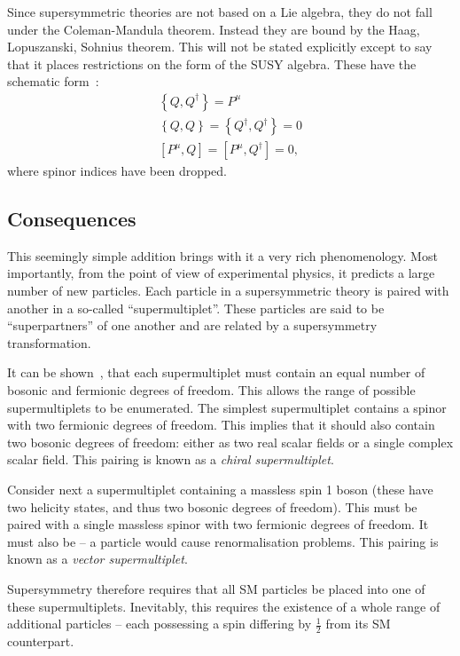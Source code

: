 Since supersymmetric theories are not based on a Lie algebra, they do not fall
under the Coleman-Mandula theorem. Instead they are bound by the Haag,
Lopuszanski, Sohnius theorem. This will not be stated explicitly except to say
that it places restrictions on the form of the \ac{SUSY} algebra. These have the
schematic form~\cite{susy_primer}:
\begin{eqnarray}
\label{eqn:susy_commutator}
\left\{Q,Q^{\dagger}\right\} = P^{\mu}\\
\left\{Q,Q\right\} = \left\{Q^{\dagger}, Q^{\dagger}\right\} = 0\\
\left[P^{\mu}, Q\right] = \left[P^{\mu}, Q^{\dagger}\right] = 0,
\end{eqnarray}
where spinor indices have been dropped.

\subsection{Consequences}
\label{sec:consequences}
This seemingly simple addition brings with it a very rich phenomenology. Most
importantly, from the point of view of experimental physics, it predicts a large
number of new particles. Each particle in a supersymmetric theory is paired with
another in a so-called ``supermultiplet''. These particles are said to be
``superpartners'' of one another and are related by a supersymmetry
transformation.

It can be shown~\cite{susy_primer}, that each supermultiplet must contain an
equal number of bosonic and fermionic degrees of freedom. This allows the range
of possible supermultiplets to be enumerated. The simplest supermultiplet
contains a spinor with two fermionic degrees of freedom. This implies that it
should also contain two bosonic degrees of freedom: either as two real scalar
fields or a single complex scalar field. This pairing is known as a \emph{chiral
  supermultiplet}.

Consider next a supermultiplet containing a massless spin 1 boson (these have
two helicity states, and thus two bosonic degrees of freedom). This must be
paired with a single massless spinor with two fermionic degrees of freedom. It
must also be \spinhalf -- a \spinthreetwo particle would cause renormalisation
problems. This pairing is known as a \emph{vector supermultiplet}.

Supersymmetry therefore requires that all \ac{SM} particles be placed into one
of these supermultiplets. Inevitably, this requires the existence of a whole
range of additional particles -- each possessing a spin differing by
$\frac{1}{2}$ from its \ac{SM} counterpart.

